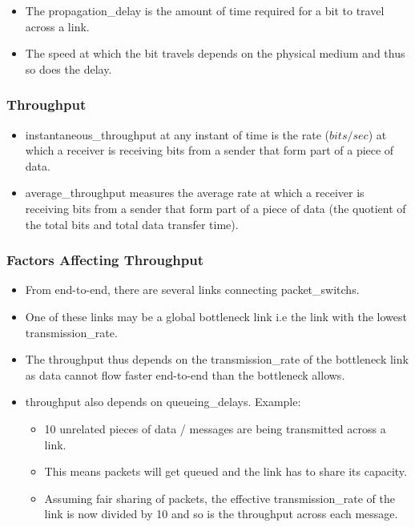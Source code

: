 \documentclass{article}
\begin{document}
\begin{itemize}
    \item The \gls{propagation_delay} is the amount of time required for a bit to travel across a link.
    \item The speed at which the bit travels depends on the physical medium and thus so does the delay.
\end{itemize}

\subsubsection{Throughput}

\begin{itemize}
    \item \Gls{instantaneous_throughput} at any instant of time is the rate ($bits/sec$) at which a receiver is receiving bits from a sender that form part of a piece of data.
    \item \Gls{average_throughput} measures the average rate at which a receiver is receiving bits from a sender that form part of a piece of data (the quotient of the total bits and total data transfer time).
\end{itemize}

\subsubsection{Factors Affecting Throughput}

\begin{itemize}
    \item From end-to-end, there are several links connecting \glspl*{packet_switch}.
    \item One of these links may be a global bottleneck link i.e the link with the lowest \gls*{transmission_rate}.
    \item The \gls{throughput} thus depends on the \gls*{transmission_rate} of the bottleneck link as data cannot flow faster end-to-end than the bottleneck allows.
    \item \Gls*{throughput} also depends on \glspl*{queueing_delay}. Example:
    \begin{itemize}
        \item 10 unrelated pieces of data / messages are being transmitted across a link.
        \item This means packets will get queued and the link has to share its capacity.
        \item Assuming fair sharing of packets, the effective \gls*{transmission_rate} of the link is now divided by 10 and so is the \gls*{throughput} across each message.
    \end{itemize}
\end{itemize}
\end{document}
